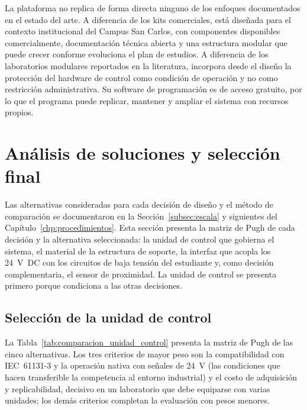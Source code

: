 \documentclass[12pt,a4paper,oneside]{report}
\begin{document}
La plataforma no replica de forma directa ninguno de los enfoques documentados en el estado del arte. A diferencia de los kits comerciales, está diseñada para el contexto institucional del Campus San Carlos, con componentes disponibles comercialmente, documentación técnica abierta y una estructura modular que puede crecer conforme evoluciona el plan de estudios. A diferencia de los laboratorios modulares reportados en la literatura, incorpora desde el diseño la protección del hardware de control como condición de operación y no como restricción administrativa. Su software de programación es de acceso gratuito, por lo que el programa puede replicar, mantener y ampliar el sistema con recursos propios.

\section{Análisis de soluciones y selección final}
\label{sec:analisis_soluciones}

Las alternativas consideradas para cada decisión de diseño y el método de comparación se documentaron en la Sección~\ref{subsec:escala} y siguientes del Capítulo~\ref{chp:procedimientos}. Esta sección presenta la matriz de Pugh de cada decisión y la alternativa seleccionada: la unidad de control que gobierna el sistema, el material de la estructura de soporte, la interfaz que acopla los 24~V~DC con los circuitos de baja tensión del estudiante y, como decisión complementaria, el sensor de proximidad. La unidad de control se presenta primero porque condiciona a las otras decisiones.

\subsection{Selección de la unidad de control}
\label{subsec:seleccion_unidad}

La Tabla~\ref{tab:comparacion_unidad_control} presenta la matriz de Pugh de las cinco alternativas. Los tres criterios de mayor peso son la compatibilidad con IEC~61131-3 y la operación nativa con señales de 24~V (las condiciones que hacen transferible la competencia al entorno industrial) y el costo de adquisición y replicabilidad, decisivo en un laboratorio que debe equiparse con varias unidades; los demás criterios completan la evaluación con pesos menores.
\end{document}
